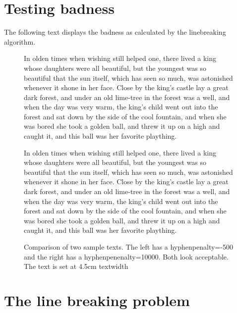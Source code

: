 {{\section{Testing badness}
The following text displays the badness as calculated by the linebreaking algorithm.
\begin{figure*}[htb]
\fussy
{} 
\begin{minipage}[t]{4.5cm}
\mbox{}
\trypar{}
In olden times when wishing
still helped one, there lived a
king whose daughters were all
beautiful, but the youngest was so
beautiful that the sun itself,
which has seen so much, was
astonished whenever it shone in
her face. Close by the king's
castle lay a great dark forest,
and under an old lime-tree in the
forest was a well, and when
the day was very warm, the
king's child went out into the 
forest and sat down by the side
of the cool fountain, and when she was bored she
took a golden ball, and threw it up on a high and caught it, and this
ball was her favorite plaything. \par
\end{minipage}
\hspace{2cm}
\begin{minipage}[t]{4.5cm}
\mbox{}
\trypar{}
In olden times when wishing
still helped one, there lived a
king whose daughters were all
beautiful, but the youngest was so
beautiful that the sun itself,
which has seen so much, was
astonished whenever it shone in
her face. Close by the king's
castle lay a great dark forest,
and under an old lime-tree in the
forest was a well, and when
the day was very warm, the
king's child went out into the 
forest and sat down by the side
of the cool fountain, and when she was bored she
took a golden ball, and threw it up on a high and caught it, and this
ball was her favorite plaything. \par
\end{minipage}
\caption{Comparison of two sample texts. The left has a hyphenpenalty=-500 and the right has a hyphenpenenalty=10000. Both look acceptable. The text is set at 4.5cm textwidth}
\end{figure*}

\lorem

\lorem

\lorem



\section{The line breaking problem}

}}
